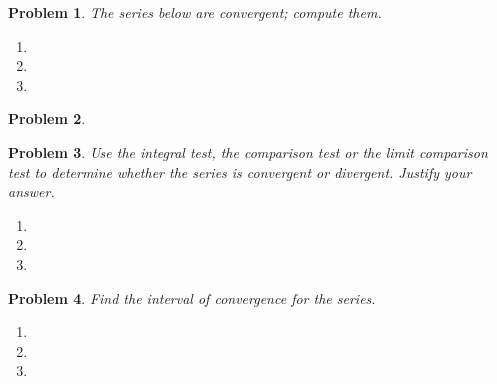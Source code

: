 \documentclass{article}
\renewcommand{\fcProblemRef}{\theproblem.\theenumi}
\newtheorem{problem}{Problem}
\begin{document}
\begin{problem}The series below are convergent; compute them. 
\begin{enumerate}[ref={\fcProblemRef}]
\item  
\item  
\item  

\end{enumerate}
\end{problem}
 
 
 
\begin{problem}

\end{problem}

\begin{problem}Use the integral test, the comparison test or the limit comparison test to determine whether the series is convergent or divergent. Justify your answer.
\begin{enumerate}
\item 
\item 
\item 

\end{enumerate}
\end{problem}

\begin{problem}
Find the interval of convergence for the series.
\begin{enumerate}[ref={\fcProblemRef}]
\item 
\item 
\item 
\end{enumerate}

\end{problem}

\end{document}
